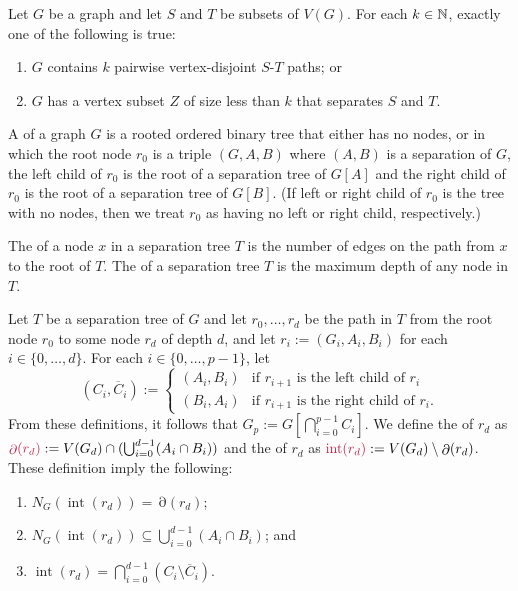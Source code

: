 \documentclass{patmorin}
\DeclareMathOperator{\interior}{int}
\DeclareMathOperator{\boundary}{\partial}
\begin{document}
\begin{thm}\label{menger}
  Let $G$ be a graph and let $S$ and $T$ be subsets of $V(G)$. For each $k\in\mathbb{N}$, exactly one of the following is true:
  \begin{enumerate}[nosep,nolistsep,label=\rm(\roman*),ref=(\roman*)2]
      \item $G$ contains $k$ pairwise vertex-disjoint $S$-$T$ paths; or
      \item $G$ has a vertex subset $Z$ of size less than $k$ that separates $S$ and $T$.
  \end{enumerate}
\end{thm}

A  of a graph $G$ is a rooted ordered binary tree that either has no nodes, or in which the root node $r_0$ is a triple $(G,A,B)$ where $(A,B)$ is a separation of $G$, the left child of $r_0$ is the root of a separation tree of $G[A]$ and the right child of $r_0$ is the root of a separation tree of $G[B]$. (If left or right child of $r_0$ is the tree with no nodes, then we treat $r_0$ as having no left or right child, respectively.)

The  of a node $x$ in a separation tree $T$ is the number of edges on the path from $x$ to the root of $T$.
 The  of a separation tree $T$ is the maximum depth of any node in $T$.

Let $T$ be a separation tree of $G$ and let $r_0,\ldots,r_d$ be the path in $T$ from the root node $r_0$ to some node $r_d$ of depth $d$, and let $r_i:=(G_i,A_i,B_i)$ for each $i\in\{0,\ldots,d\}$.
For each $i\in\{0,\ldots,p-1\}$, let
\[
  (C_i,\overline{C}_i):=
  \begin{cases}
    (A_i,B_i) & \text{if $r_{i+1}$ is the left child of $r_{i}$} \\
    (B_i,A_i) & \text{if $r_{i+1}$ is the right child of $r_{i}$.}
  \end{cases}
\]
From these definitions, it follows that $G_p := G[\bigcap_{i=0}^{p-1} C_i]$.
We define the  of $r_d$ as $\mathdefin{\boundary(r_d)}:=V(G_d)\cap(\bigcup_{i=0}^{d-1}(A_i\cap B_i))$ and the  of $r_d$ as $\mathdefin{\interior(r_d)}:=V(G_d) \setminus \boundary(r_d)$. These definition imply the following:
\begin{enumerate}[nosep,nolistsep,label=(T\arabic*)]
  \item $N_G(\interior(r_d))=\boundary(r_d)$;
  \item\label{small_boundary} $N_G(\interior(r_d))\subseteq \bigcup_{i=0}^{d-1}(A_i\cap B_i)$; and
  \item\label{small_interior} $\interior(r_d) = \bigcap_{i=0}^{d-1}(C_i\setminus\overline{C}_i)$.
\end{enumerate}
\end{document}
